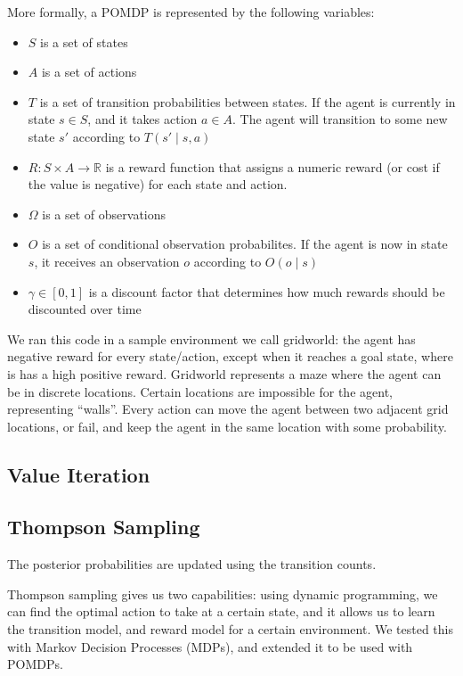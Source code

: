 \documentclass{pset}
\begin{document}
More formally, a POMDP is represented by the following variables: 

\begin{itemize}
\item $S$ is a set of states
\item $A$ is a set of actions
\item $T$ is a set of transition probabilities between states. If the agent is currently in state $s
\in S$, and it takes action $a \in A$. The agent will transition to some new state $s'$ according to 
$T(s' \mid s,a)$
\item $R: S \times A \rightarrow \mathbb{R}$ is a reward function that assigns a numeric reward (or
cost if the value is negative) for each state and action. 
\item $\Omega$ is a set of observations
\item $O$ is a set of conditional observation probabilites. If the agent is now in state $s$, 
it receives an observation $o$ according to $O(o \mid s)$
\item $\gamma \in [0,1]$ is a discount factor that determines how much rewards should be discounted over time
\end{itemize}
 
We ran this code in a sample environment we call gridworld: the agent has negative
reward for every state/action, except when it reaches a goal state, where is has
a high positive reward.
Gridworld represents a maze where the agent can be in discrete locations. Certain
locations are impossible for the agent, representing ``walls''. Every action can
move the agent between two adjacent grid locations, or fail, and keep the agent in
the same location with some probability.

\subsection{Value Iteration}

\subsection{Thompson Sampling}

The posterior probabilities are updated using the transition counts.

Thompson sampling gives us two capabilities: using dynamic programming, we can
find the optimal action to take at a certain state, and it allows us to learn
the transition model, and reward model for a certain environment. We tested this
with Markov Decision Processes (MDPs), and extended it to be used with POMDPs.
\end{document}

